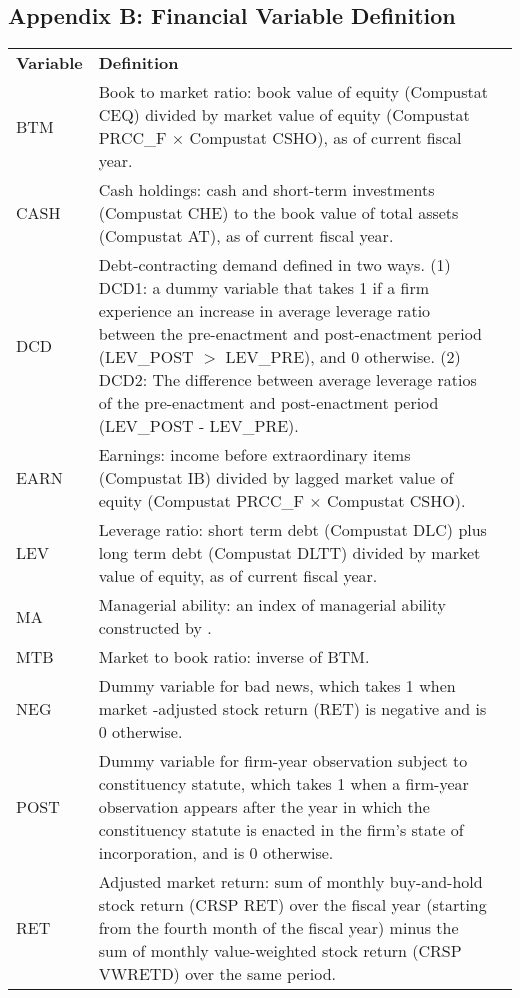 \documentclass[a4paper]{article}
\begin{document}
\subsection{Appendix B: Financial Variable Definition}
\begin{table}[H]
	\centering
	\begin{tabular}{lp{15cm}p{15cm}}
		\textbf{Variable} & \textbf{Definition} \\
		BTM   & Book to market ratio: book value of equity (Compustat CEQ) divided by market value of equity (Compustat PRCC\_F $\times$ Compustat CSHO), as of current fiscal year. \\
		CASH  & Cash holdings: cash and short-term investments (Compustat CHE) to the book value of total assets (Compustat AT), as of current fiscal year. \\
		DCD   & Debt-contracting demand defined in two ways. (1) DCD1: a dummy variable that takes 1 if a firm experience an increase in average leverage ratio between the pre-enactment and post-enactment period (LEV\_POST $>$ LEV\_PRE), and 0 otherwise. (2) DCD2: The difference between average leverage ratios of the pre-enactment and post-enactment period (LEV\_POST - LEV\_PRE). \\
		EARN  & Earnings: income before extraordinary items (Compustat IB) divided by lagged market value of equity (Compustat PRCC\_F $\times$ Compustat CSHO). \\
		LEV   & Leverage ratio: short term debt (Compustat DLC) plus long term debt (Compustat DLTT) divided by market value of equity, as of current fiscal year. \\
		MA    & Managerial ability: an index of managerial ability constructed by \cite{demerjianQuantifyingManagerialAbility2012}. \\
		MTB   & Market to book ratio: inverse of BTM. \\
		NEG   & Dummy variable for bad news, which takes 1 when market -adjusted stock return (RET) is negative and is 0 otherwise. \\
		POST  & Dummy variable for firm-year observation subject to constituency statute, which takes 1 when a firm-year observation appears after the year in which the constituency statute is enacted in the firm's state of incorporation, and is 0 otherwise. \\
		RET   & Adjusted market return: sum of monthly buy-and-hold stock return (CRSP RET) over the fiscal year (starting from the fourth month of the fiscal year) minus the sum of monthly value-weighted stock return (CRSP VWRETD) over the same period.  \\

\end{tabular}
\end{table}
\end{document}
